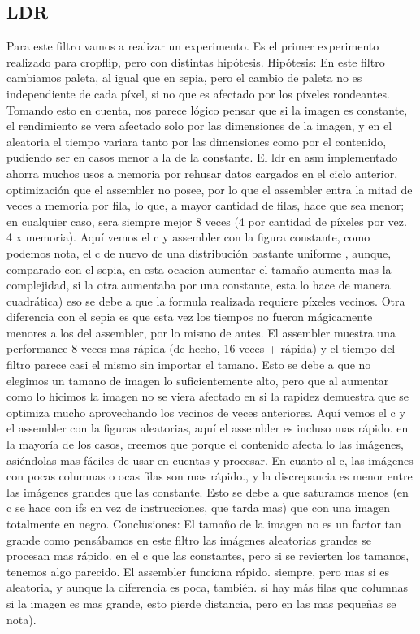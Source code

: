 \subsection{LDR}
\hfill \break
Para este filtro vamos a realizar un experimento. Es el primer  experimento realizado para cropflip, pero con distintas hipótesis.
\hfill \break
Hipótesis: En este filtro cambiamos paleta, al igual que en sepia, pero el cambio de paleta no es independiente de cada píxel, si no que es afectado por los píxeles rondeantes. Tomando esto en cuenta, nos parece lógico pensar que si la imagen es constante, el rendimiento se vera afectado solo por las dimensiones de la imagen, y en el aleatoria el tiempo variara tanto por las dimensiones como por el contenido, pudiendo ser en casos menor a la de la constante. El ldr en asm implementado ahorra muchos usos a memoria por rehusar datos cargados en el ciclo anterior, optimización que el assembler no posee, por lo que el assembler entra la mitad de veces a memoria por fila, lo que, a mayor cantidad de filas, hace que sea menor; en cualquier caso, sera siempre mejor 8 veces (4 por cantidad de píxeles por vez. 4 x memoria).    
\hfill \break
Aquí vemos el c y assembler con la figura constante, como podemos nota, el c de nuevo de una distribución bastante uniforme , aunque, comparado con el sepia, en esta ocacion aumentar el tamaño aumenta mas la complejidad, si la otra aumentaba por una constante, esta lo hace de manera cuadrática) eso se debe a que la formula realizada requiere píxeles vecinos. Otra diferencia con el sepia es que esta vez los tiempos no fueron mágicamente menores a los del assembler, por lo mismo de antes. 
El assembler muestra una performance 8 veces mas rápida (de hecho, 16 veces + rápida) y el tiempo del filtro parece casi el mismo sin importar el tamano. Esto se debe a que no elegimos un tamano de imagen lo suficientemente alto, pero que al aumentar como lo hicimos la imagen no se viera afectado en si la rapidez demuestra que se optimiza mucho aprovechando los vecinos de veces anteriores.
\hfill \break
Aquí vemos el c y el assembler con la figuras aleatorias, aquí el assembler es incluso mas rápido. en la mayoría de los casos, creemos que porque el contenido afecta lo las imágenes, asiéndolas mas fáciles de usar en cuentas y procesar. En cuanto al c,   las imágenes con pocas columnas o ocas filas son mas rápido., y la discrepancia es menor entre las imágenes grandes que las constante. Esto se debe a que saturamos menos (en c se hace con ifs en vez de instrucciones, que tarda mas) que con una imagen totalmente en negro. 
\hfill \break
Conclusiones: El tamaño de la imagen no es un factor tan grande como pensábamos en este filtro las imágenes aleatorias grandes se procesan mas rápido. en  el c que las constantes, pero si se revierten los tamanos, tenemos algo parecido. El assembler funciona rápido. siempre, pero mas si es aleatoria, y aunque la diferencia es poca, también. si hay más filas que columnas si la imagen es mas grande, esto pierde distancia, pero en las mas pequeñas se nota).
